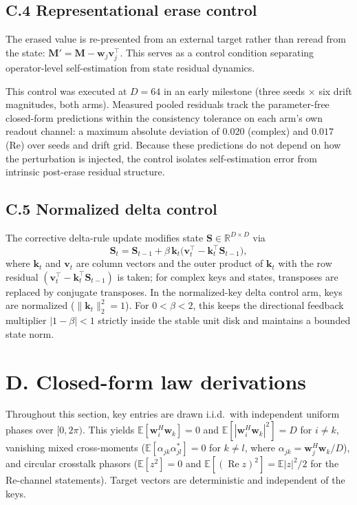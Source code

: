 \documentclass[11pt,a4paper]{article}
\newcommand{\M}{\mathbf{M}}
\newcommand{\St}{\mathbf{S}}
\newcommand{\R}{\mathbb{R}}
\begin{document}
\subsection{C.4 Representational erase control}
The erased value is re-presented from an external target rather than reread from the state: $\M' = \M - \mathbf{w}_j \mathbf{v}_j^\top$. This serves as a control condition separating operator-level self-estimation from state residual dynamics.

This control was executed at $D=64$ in an early milestone (three seeds $\times$ six drift magnitudes, both arms). Measured pooled residuals track the parameter-free closed-form predictions within the consistency tolerance on each arm's own readout channel: a maximum absolute deviation of $0.020$ (complex) and $0.017$ (Re) over seeds and drift grid. Because these predictions do not depend on how the perturbation is injected, the control isolates self-estimation error from intrinsic post-erase residual structure.

\subsection{C.5 Normalized delta control}
The corrective delta-rule update modifies state $\St \in \R^{D \times D}$ via
\begin{equation}
\St_t = \St_{t-1} + \beta\, \mathbf{k}_t \bigl(\mathbf{v}_t^\top - \mathbf{k}_t^\top \St_{t-1}\bigr),
\end{equation}
where $\mathbf{k}_t$ and $\mathbf{v}_t$ are column vectors and the outer product of $\mathbf{k}_t$ with the row residual $(\mathbf{v}_t^\top - \mathbf{k}_t^\top \St_{t-1})$ is taken; for complex keys and states, transposes are replaced by conjugate transposes.
In the normalized-key delta control arm, keys are normalized ($\|\mathbf{k}_t\|_2^2 = 1$). For $0 < \beta < 2$, this keeps the directional feedback multiplier $|1 - \beta| < 1$ strictly inside the stable unit disk and maintains a bounded state norm.

\section{D. Closed-form law derivations}\label{sec:D}

Throughout this section, key entries are drawn i.i.d.\ with independent uniform phases over $[0, 2\pi)$. This yields $\mathbb{E}[\mathbf{w}_i^H \mathbf{w}_k] = 0$ and $\mathbb{E}[|\mathbf{w}_i^H \mathbf{w}_k|^2] = D$ for $i \ne k$, vanishing mixed cross-moments ($\mathbb{E}[\alpha_{jk}\alpha_{jl}^{*}] = 0$ for $k \ne l$, where $\alpha_{jk} = \mathbf{w}_j^H \mathbf{w}_k / D$), and circular crosstalk phasors ($\mathbb{E}[z^2] = 0$ and $\mathbb{E}[(\operatorname{Re} z)^2] = \mathbb{E}|z|^2/2$ for the Re-channel statements). Target vectors are deterministic and independent of the keys.
\end{document}
